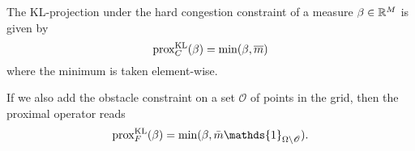 \documentclass[../report.tex]{subfiles}
\begin{document}
\begin{prop}
	The KL-projection under the hard congestion constraint of a measure $\beta\in\mathbb{R}^M$ is given by
	\begin{equation}
	\operatorname{prox}^{\operatorname{KL}} _C(\beta) = \min(\beta,\overline{m})
	\end{equation}
	where the minimum is taken element-wise.
	
	If we also add the obstacle constraint on a set $\mathscr{O}$ of points in the grid, then the proximal operator reads
	\begin{equation}
	\prox^{\KL}_F(\beta) = \min(\beta, \bar{m}\mathds{1}_{\Omega\backslash\mathscr{O}}).
	\end{equation}
\end{prop}
\end{document}
